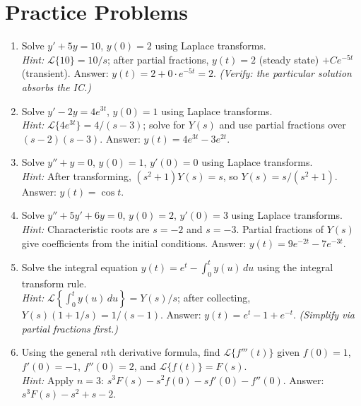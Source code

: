 \documentclass[12pt,a4paper]{article}
\begin{document}
\section{Practice Problems}

\begin{enumerate}[label=\textbf{P\arabic*.}]

\item Solve \(y' + 5y = 10\), \(y(0)=2\) using Laplace transforms.\\
      \textit{Hint:} \(\mathcal{L}\{10\}=10/s\); after partial fractions,
      \(y(t) = 2\) (steady state) \(+ Ce^{-5t}\) (transient).
      Answer: \(y(t) = 2 + 0\cdot e^{-5t} = 2\). \textit{(Verify: the particular solution absorbs the IC.)}

\item Solve \(y' - 2y = 4e^{3t}\), \(y(0)=1\) using Laplace transforms.\\
      \textit{Hint:} \(\mathcal{L}\{4e^{3t}\}=4/(s-3)\); solve for \(Y(s)\) and
      use partial fractions over \((s-2)(s-3)\).
      Answer: \(y(t) = 4e^{3t} - 3e^{2t}\).

\item Solve \(y'' + y = 0\), \(y(0)=1\), \(y'(0)=0\) using Laplace transforms.\\
      \textit{Hint:} After transforming, \((s^2+1)Y(s)=s\), so \(Y(s)=s/(s^2+1)\).
      Answer: \(y(t)=\cos t\).

\item Solve \(y'' + 5y' + 6y = 0\), \(y(0)=2\), \(y'(0)=3\) using Laplace transforms.\\
      \textit{Hint:} Characteristic roots are \(s=-2\) and \(s=-3\).
      Partial fractions of \(Y(s)\) give coefficients from the initial conditions.
      Answer: \(y(t)=9e^{-2t}-7e^{-3t}\).

\item Solve the integral equation \(y(t) = e^t - \int_0^t y(u)\,du\) using
      the integral transform rule.\\
      \textit{Hint:} \(\mathcal{L}\!\left\{\int_0^t y(u)\,du\right\}=Y(s)/s\);
      after collecting, \(Y(s)(1+1/s)=1/(s-1)\).
      Answer: \(y(t) = e^t - 1 + e^{-t}\). \textit{(Simplify via partial fractions first.)}

\item Using the general \(n\)th derivative formula, find
      \(\mathcal{L}\{f'''(t)\}\) given \(f(0)=1\), \(f'(0)=-1\), \(f''(0)=2\),
      and \(\mathcal{L}\{f(t)\}=F(s)\).\\
      \textit{Hint:} Apply \(n=3\): \(s^3F(s) - s^2f(0) - sf'(0) - f''(0)\).
      Answer: \(s^3F(s) - s^2 + s - 2\).

\end{enumerate}
\end{document}
